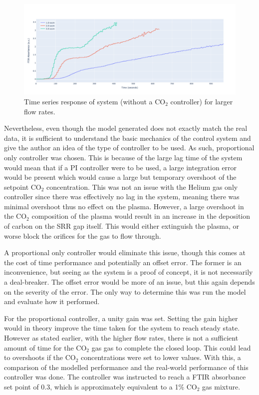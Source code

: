 \begin{figure}[h!]
	\centering
	\includegraphics[width=\linewidth]{chapter_5/figures/co2_system_characterised_large_flow_rates.png}
	\caption{Time series response of system (without a CO$_2$ controller) for larger flow rates.}
	\label{fig:co2_system_characterised_large_flow_rates}
\end{figure}

Nevertheless, even though the model generated does not exactly match the real data, it is sufficient to understand the basic mechanics of the control system and give the author an idea of the type of controller to be used. As such, proportional only controller was chosen. This is because of the large lag time of the system would mean that if a PI controller were to be used, a large integration error would be present which would cause a large but temporary overshoot of the setpoint CO$_2$ concentration. This was not an issue with the Helium gas only controller since there was effectively no lag in the system, meaning there was minimal overshoot thus no effect on the plasma. However, a large overshoot in the CO$_2$ composition of the plasma would result in an increase in the deposition of carbon on the SRR gap itself. This would either extinguish the plasma, or worse block the orifices for the gas to flow through. 

A proportional only controller would eliminate this issue, though this comes at the cost of time performance and potentially an offset error. The former is an inconvenience, but seeing as the system is a proof of concept, it is not necessarily a deal-breaker. The offset error would be more of an issue, but this again depends on the severity of the error. The only way to determine this was run the model and evaluate how it performed.

For the proportional controller, a unity gain was set. Setting the gain higher would in theory improve the time taken for the system to reach steady state. However as stated earlier, with the higher flow rates, there is not a sufficient amount of time for the CO$_2$ gas gas to complete the closed loop. This could lead to overshoots if the CO$_2$ concentrations were set to lower values. With this, a comparison of the modelled performance and the real-world performance of this controller was done. The controller was instructed to reach a FTIR absorbance set point of 0.3, which is approximately equivalent to a 1\% CO$_2$ gas mixture.


